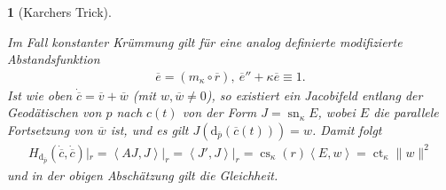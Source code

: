 \documentclass[paper=A4, twoside, chapterprefix=true, bibliography=totoc, headsepline]{scrbook}
\DeclareMathOperator{\calJ}{\mathcal{J}}
\DeclareMathOperator{\cs}{cs}       %
\DeclareMathOperator{\ct}{ct}       %
\DeclareMathOperator{\sn}{sn}       %
\newcommand{\dop}{\mathrm{d}}
\theoremstyle{plain}
\theoremstyle{nonumberplain}
\theoremstyle{empty}
\newtheorem{emptythm}{}%
\theoremstyle{break}
\begin{document}
\begin{emptythm}[Karchers Trick]
\begin{center}
\end{center}
  Im Fall konstanter Kr\"ummung gilt f\"ur eine analog definierte modifizierte Abstandsfunktion
  \begin{align*}
    \overline e = (m_{\kappa} \circ \overline r), \
    \overline e '' + \kappa \overline e \equiv 1.
  \end{align*}
  Ist wie oben $\dot{\overline c} = \overline v + \overline w$ (mit $w,\overline w \neq 0$), so existiert ein Jacobifeld entlang der Geod\"atischen von $p$ nach $c(t)$ von der Form $J = \sn_{\kappa} E$, wobei $E$ die parallele Fortsetzung von $\overline w$ ist, und es gilt $J(\dop_{\overline p}(\overline c(t))) = w$.
  Damit folgt
  \begin{align*}
    H_{\dop_{\overline p}}(\dot{\overline c}, \dot{\overline c})|_r = \left<AJ,J\right>|_r
    = \left<J',J\right>|_r
    = \cs_{\kappa}(r)\left<E,w\right>
    = \ct_{\kappa}\|w\|^2
  \end{align*}
  und in der obigen Absch\"atzung gilt die Gleichheit.
\end{emptythm}
\end{document}
